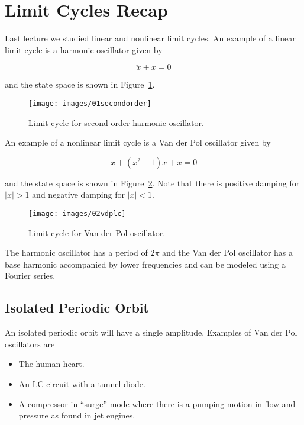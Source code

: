 \mainmatter%
\setcounter{page}{1}

\lectureseries[\course]{\course}

\date{January 7, 2010}

\setaddress%

\setcounter{lecture}{1}
\setcounter{chapter}{1}

%
\label{lec:mae281a_lec02}

\section{Limit Cycles Recap}
Last lecture we studied linear and nonlinear limit cycles.
An example of a linear limit cycle is a  harmonic oscillator given by

\begin{equation*}
\ddot{x} + x = 0
\end{equation*}

and the state space is shown in Figure~\ref{fig:02secondorder}.

\begin{figure}[ht!]
\centering
\texttt{[image: images/01secondorder]}%
\label{fig:02secondorder}
\caption{Limit cycle for second order harmonic oscillator.}
\end{figure}

An example of a nonlinear limit cycle is a Van der Pol oscillator given by

\begin{equation*}
\ddot{x} + (x^2-1)\ddot{x} + x = 0
\end{equation*}

and the state space is shown in Figure~\ref{fig:02vdplc}.
Note that there is positive damping for $|x|>1$ and negative damping for $|x|<1$.

\begin{figure}[ht!]
\centering
\texttt{[image: images/02vdplc]}
\caption{Limit cycle for Van der Pol oscillator.}%
\label{fig:02vdplc}
\end{figure}

The harmonic oscillator has a period of $2\pi$ and the Van der Pol oscillator has a base harmonic accompanied by lower frequencies and can be modeled using a Fourier series.

\subsection{Isolated Periodic Orbit}
An isolated periodic orbit will have a single amplitude.
Examples of Van der Pol oscillators are
\begin{itemize}
\item The human heart.
\item An LC circuit with a tunnel diode.
\item A compressor in ``surge'' mode where there is a pumping motion in flow and pressure as found in jet engines.
\end{itemize}

